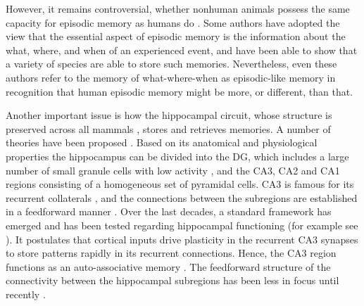 \documentclass[utf8]{frontiersSCNS} %
\begin{document}
However, it remains controversial, whether nonhuman animals possess the same capacity for episodic memory as humans do \cite{suddendorf2007evolution, cheng2016dissociating}. Some authors have adopted the view that the essential aspect of episodic memory is the information about the what, where, and when of an experienced event, and have been able to show that a variety of species are able to store such  memories\cite{babb2006episodic, clayton1998episodic, dally2006food, zentall2001episodic, dere2005episodic, kaminski2008prospective, hoffman2009memory}. Nevertheless, even these authors refer to the memory of what-where-when as episodic-like memory in recognition that human episodic memory might be more, or different, than that.

Another important issue is how the hippocampal circuit, whose structure is preserved across all mammals \cite{allen2013evolution}, stores and retrieves memories. A number of theories have been proposed \cite{treves1992computational, marr1991simple, mcclelland1995there, HIPO:HIPO450020209}. 
Based on its anatomical and physiological properties the hippocampus can be divided into the DG, which includes a large number of small granule cells with low activity \cite{leutgeb2007pattern}, and the CA3, CA2 and CA1 regions consisting of a homogeneous set of pyramidal cells. CA3 is famous for its recurrent collaterals \cite{ishizuka1990organization, li1994hippocampal}, and the connections between the subregions are established in a feedforward manner \cite{amaral1990chapter}. Over the last decades, a standard framework has emerged and has been tested regarding hippocampal functioning (for example see \cite{fontanari1995model}). It postulates that cortical inputs drive plasticity in the recurrent CA3 synapses to store patterns rapidly in its recurrent connections. Hence, the CA3 region functions as an auto-associative memory \cite{marr1991simple, mcnaughton1987hippocampal, treves1994computational, o1994hippocampal}. The feedforward structure of the connectivity between the hippocampal subregions \cite{amaral1990chapter} has been less in focus until recently \cite{neher2015memory, pyka2014pattern}.  
\end{document}

